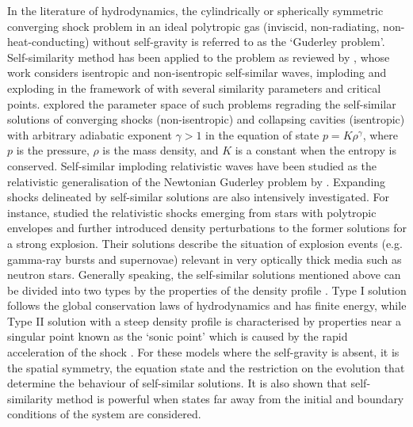 \documentclass[fleqn,usenatbib]{mnras}
\begin{document}
In the literature of hydrodynamics, the cylindrically or spherically symmetric converging shock problem in an ideal polytropic gas (inviscid, non-radiating, non-heat-conducting) without self-gravity is referred to as the `Guderley problem'. Self-similarity method has been applied to the problem as reviewed by \citet{meyer1982selfsimilar}, whose work considers isentropic and non-isentropic self-similar waves, imploding and exploding in the framework of \citet{guderley1942powerful} with several similarity parameters and critical points. \citet{lazarus1981self} explored the parameter space of such problems regrading the self-similar solutions of converging shocks (non-isentropic) and collapsing cavities (isentropic) with arbitrary adiabatic exponent $\gamma>1$ in the equation of state $p=K\rho^{\gamma}$, where $p$ is the pressure, $\rho$ is the mass density, and $K$ is a constant when the entropy is conserved. Self-similar imploding relativistic waves have been studied as the relativistic generalisation of the Newtonian Guderley problem  by \citet{hidalgo2005self}. Expanding shocks delineated by self-similar solutions are also intensively investigated. For instance, \citet{pan2006self} studied the relativistic shocks emerging from stars with polytropic envelopes and \citet{oren2009discrete} further introduced density perturbations to the former solutions for a strong explosion. Their solutions describe the situation of explosion events (e.g. gamma-ray bursts and supernovae) relevant in very optically thick media such as neutron stars. Generally speaking, the self-similar solutions mentioned above can be divided into two types by the properties of the density profile \citep{oren2009discrete}. Type I solution follows the global conservation laws of hydrodynamics and has finite energy, while Type II solution with a steep density profile is characterised by properties near a singular point known as the `sonic point' which is caused by the rapid acceleration of the shock \citep{pan2006self}. For these models where the self-gravity is absent, it is the spatial symmetry, the equation state and the restriction on the evolution that determine the behaviour of self-similar solutions. It is also shown that self-similarity method is powerful when states far away from the initial and boundary conditions of the system are considered.
\end{document}
